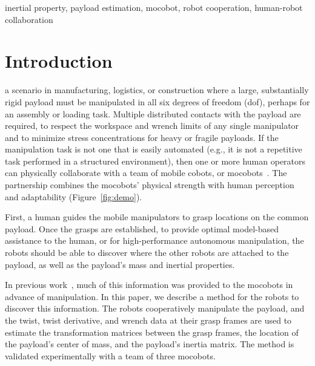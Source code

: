 \documentclass[letterpaper, 10 pt, journal, twoside]{IEEEtran}
\begin{document}
\begin{IEEEkeywords}
inertial property, payload estimation, mocobot, robot cooperation, human-robot collaboration
\end{IEEEkeywords}

\section{Introduction} 

 a scenario in manufacturing, logistics, or construction where a large, substantially rigid payload must be manipulated in all six degrees of freedom (dof), perhaps for an assembly or loading task. Multiple distributed contacts with the payload are required, to respect the workspace and wrench limits of any single manipulator and to minimize stress concentrations for heavy or fragile payloads. 
If the manipulation task is not one that is easily automated (e.g., it is not a repetitive task performed in a structured environment), then one or more human operators can physically collaborate with a team of mobile cobots, or mocobots~\cite{elwin2022human}.  The partnership combines the mocobots' physical strength with human perception and adaptability  (Figure~\ref{fig:demo}). 

First, a human guides the mobile manipulators to grasp locations on the common payload. Once the grasps are established, to provide optimal model-based assistance to the human, or for high-performance autonomous manipulation, the robots should be able to discover where the other robots are attached to the payload, as well as the payload's mass and inertial properties. 

In previous work~\cite{elwin2022human}, much of this information was provided to the mocobots in advance of manipulation. In this paper, we describe a method for the robots to discover this information. The robots cooperatively manipulate the payload, and the twist, twist derivative, and wrench data at their grasp frames are used to estimate the transformation matrices between the grasp frames, the location of the payload's center of mass, and the payload's inertia matrix. The method is validated experimentally with a team of three mocobots.
\end{document}

